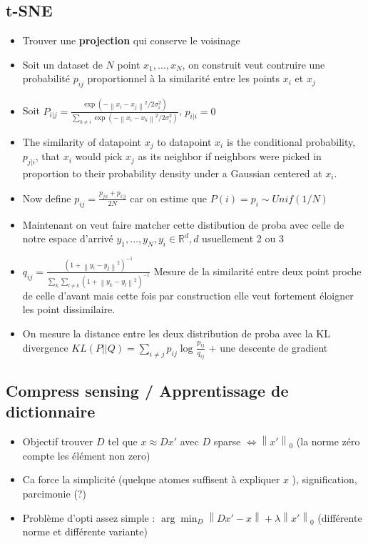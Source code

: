 \documentclass{article}
\begin{document}
\subsection{t-SNE}
\begin{itemize}
    \item Trouver une \textbf{projection} qui conserve le voisinage
    \item Soit un dataset de $ N $ point $ x_1, \dots, x_N $, on construit veut contruire une probabilité $ p_{ij} $ proportionnel à la similarité entre les points $ x_i $ et $ x_j $ 
    \item Soit $ P_{i|j} = \frac{ \exp (- \left\| x_i - x_j \right\| ^2 / 2 \sigma_i ^2 ) }{\sum_{k \neq i}^{} \exp (- \left\| x_i - x_k \right\| ^2 / 2 \sigma_i ^2 ) } $, $ p_{i|i} = 0 $ 
    \item The similarity of datapoint $x_{j}$ to datapoint $x_{i}$ is the conditional probability, $ p_{j|i} $, that $x_{i}$ would pick $x_{j}$ as its neighbor if neighbors were picked in proportion to their probability density under a Gaussian centered at $x_{i}$.
    \item Now define $ p_{ij} = \frac{p_{j|i} + p_{i|j}}{2N}$ car on estime que $ P(i) = p_i \sim Unif (1/N) $ 
    \item Maintenant on veut faire matcher cette distibution de proba avec celle de notre espace d'arrivé $ y_1, \dots, y_N, y_i \in \mathbb{R}^d, d $ usuellement 2 ou 3
    \item $ q_{ij} = \frac{(1 + \left\| y_i - y_j \right\| ^2) ^{-1}}{\sum_{k}^{} \sum_{l \neq k}^{} ( 1 + \left\| y_k - y_l \right\| ^2) ^{-1}}$ Mesure de la similarité entre deux point proche de celle d'avant mais cette fois par construction elle veut fortement éloigner les point dissimilaire.
    \item On mesure la distance entre les deux distribution de proba avec la KL divergence $ KL(P || Q) = \sum_{i \neq j}^{}p_{ij} \log_{} \frac{p_{ij}}{q_{ij}} $ + une descente de gradient 
\end{itemize}

\subsection{Compress sensing / Apprentissage de dictionnaire}
\begin{itemize}
    \item Objectif trouver $ D $ tel que $ x \approx D x' $ avec $ D $ sparse $ \Leftrightarrow \left\| x' \right\|_0  $ (la norme zéro compte les élément non zero)
    \item Ca force la simplicité (quelque atomes suffisent à expliquer $ x $ ), signification, parcimonie (?)
    \item Problème d'opti assez simple : $ \arg \min _D \left\| D x' - x \right\| + \lambda \left\| x' \right\| _0 $ (différente norme et différente variante)
\end{itemize}
\end{document}
